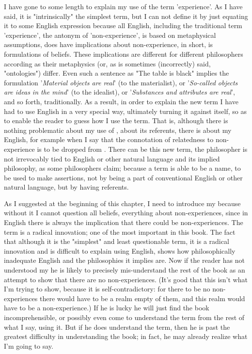 \documentclass[10pt,twoside,draft]{memoir}
\newcommand{\formulation}[1]{'\textit{#1}'}
\begin{document}
{I have gone to some length to explain my use of the term 'experience'. 
As I have said, it is "intrinsically" the simplest term, but I can not define it 
by just equating it to some English expression because all English, including 
the traditional term 'experience', the antonym of 'non-experience', is based 
on metaphysical assumptions, does have implications about non-experience, 
in short, is formulations of beliefs. These implications are different for 
different philosophers according as their metaphysics (or, as is sometimes 
(incorrectly) said, "ontologies") differ. Even such a sentence as "The table is 
black" implies the formulation \formulation{Material objects are real} (to the materialist), 
or \formulation{So-called objects are ideas in the mind} (to the idealist), or \formulation{Substances 
and attributes are real}, and so forth, traditionally. As a result, in order to 
explain the new term I have had to use English in a very special way, 
ultimately turning it against itself, so as to enable the reader to guess how I 
use the term. That is, although there is nothing problematic about my use of 
, about its referents, there is about my English, for example 
when I say that the connotation of relatedness to non-experience is to be 
dropped from . There can be this new term, the philosopher is 
not irrevocably tied to English or other natural language and its implied 
philosophy, as some philosophers claim; because a term is able to be a name, 
to be used to make assertions, not by being a part of conventional English or 
other natural language, but by having referents. 

As I suggested at the beginning of this chapter, I need to introduce my 
 because without it I cannot question all beliefs, everything 
about non-experiences, since in English there is always the implication that 
there could be non-experiences. The term is a radical innovation; one of the 
most important in this book. The fact that although it is the "simplest" and 
least questionable term, it is a radical innovation and is difficult to explain 
using English, shows how philosophically inadequate English and the 
philosophies it implies are. Now if the reader has not understood my 
 he is likely to precisely mis-understand the rest of the book as 
an attempt to show that there are no non-experiences. (It's good that this 
isn't what I'm trying to show, because it is self-contradictory: for there to be 
no non-experiences there would have to be a realm empty of them, and this 
realm would have to be a non-experience.) If he is lucky he will just find the 
book incomprehensible, or possibly even come to understand the term from 
the rest of what I say, using it. But if he does understand the term, then he is 
past the greatest difficulty in understanding the book; in fact, he may 
already realize what I'm going to say. 

}
\end{document}
